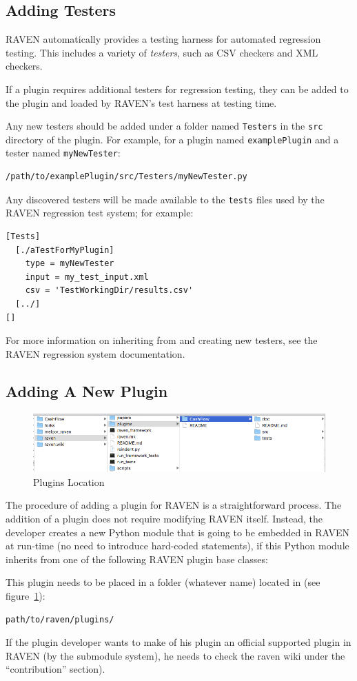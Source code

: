 \subsection{Adding Testers}
RAVEN automatically provides a testing harness for automated regression testing. This includes a
variety of \emph{testers}, such as CSV checkers and XML checkers.

If a plugin requires additional testers for regression testing, they can be added to the plugin and
loaded by RAVEN's test harness at testing time.

Any new testers should be added under a folder named \texttt{Testers} in the \texttt{src} directory
of the plugin. For example, for a plugin named \texttt{examplePlugin} and a tester named
\texttt{myNewTester}:
\begin{lstlisting}[morekeywords={examplePlugin,myNewTester}]
  /path/to/examplePlugin/src/Testers/myNewTester.py
\end{lstlisting}
Any discovered testers will be made available to the \texttt{tests} files used by the RAVEN
regression test system; for example:
\begin{lstlisting}[morekeywords={myNewTester}]
[Tests]
  [./aTestForMyPlugin]
    type = myNewTester
    input = my_test_input.xml
    csv = 'TestWorkingDir/results.csv'
  [../]
[]
\end{lstlisting}

For more information on inheriting from and creating new testers, see the RAVEN regression system
documentation.

\subsection{Adding A New Plugin}
\begin{figure}
\centering
\includegraphics[width=1.0\textwidth]{pics/plugins_location.png}
\caption{Plugins Location}
\label{fig:pluginsLocation}
\end{figure}
The procedure of adding a plugin for RAVEN is a straightforward process.
The addition of a plugin does not require modifying RAVEN itself.
Instead, the developer creates a new Python module that is going to be embedded
in RAVEN at run-time (no need to introduce  hard-coded statements), if this Python module
inherits from one of the following RAVEN plugin base classes:


This plugin needs to be placed in a folder (whatever name) located in (see figure~\ref{fig:pluginsLocation}):
\begin{lstlisting}[language=bash]
 path/to/raven/plugins/
\end{lstlisting}
If the plugin developer wants to make of his plugin
an official supported plugin in RAVEN (by the submodule system), he needs to check
the raven wiki under the ``contribution'' section).
